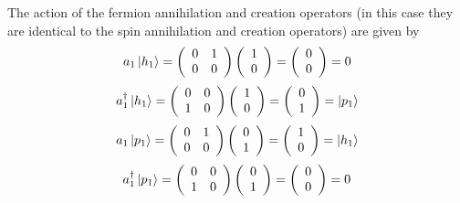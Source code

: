 \documentclass[aps,preprint]{revtex4}%
\begin{document}
The action of the fermion annihilation and creation operators (in this case
they are identical to the spin annihilation and creation operators) are given
by
\begin{equation}
a_{1}\left\vert h_{1}\right\rangle =\left(
\begin{array}
[c]{cc}%
0 & 1\\
0 & 0
\end{array}
\right)  \left(
\begin{array}
[c]{c}%
1\\
0
\end{array}
\right)  =\left(
\begin{array}
[c]{c}%
0\\
0
\end{array}
\right)  =0
\end{equation}%
\begin{equation}
a_{1}^{\dagger}\left\vert h_{1}\right\rangle =\left(
\begin{array}
[c]{cc}%
0 & 0\\
1 & 0
\end{array}
\right)  \left(
\begin{array}
[c]{c}%
1\\
0
\end{array}
\right)  =\left(
\begin{array}
[c]{c}%
0\\
1
\end{array}
\right)  =\left\vert p_{1}\right\rangle
\end{equation}%
\begin{equation}
a_{1}\left\vert p_{1}\right\rangle =\left(
\begin{array}
[c]{cc}%
0 & 1\\
0 & 0
\end{array}
\right)  \left(
\begin{array}
[c]{c}%
0\\
1
\end{array}
\right)  =\left(
\begin{array}
[c]{c}%
1\\
0
\end{array}
\right)  =\left\vert h_{1}\right\rangle
\end{equation}%
\begin{equation}
a_{1}^{\dagger}\left\vert p_{1}\right\rangle =\left(
\begin{array}
[c]{cc}%
0 & 0\\
1 & 0
\end{array}
\right)  \left(
\begin{array}
[c]{c}%
0\\
1
\end{array}
\right)  =\left(
\begin{array}
[c]{c}%
0\\
0
\end{array}
\right)  =0
\end{equation}
\end{document}
